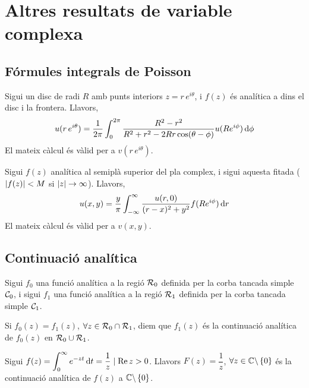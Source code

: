 \section{Altres resultats de variable complexa}
\subsection{Fórmules integrals de Poisson}
Sigui un disc de radi $R$ amb punts interiors $z=r\,e^{i\theta}$, i $f(z)$ és analítica a dins el disc i la frontera. Llavors,
\begin{align}
    u(r\,e^{i\theta}) = \frac{1}{2\pi} \int_{0}^{2\pi} \frac{R^{2} - r^{2}}{R^{2} + r^{2} - 2Rr \cos(\theta - \phi)} u(Re^{i\phi}) \mathop{}\!\mathrm{d} \phi
\end{align}
El mateix càlcul és vàlid per a $v(r\,e^{i\theta})$.

Sigui $f(z)$ analítica al semiplà superior del pla complex, i sigui aquesta fitada ( $\left| f(z) \right| < M$ si $\left| z \right| \to \infty$). Llavors,
\begin{align}
    u(x,y) = \frac{y}{\pi} \int_{-\infty}^{\infty} \frac{u(r,0)}{(r - x)^{2} + y^{2}} f(Re^{i\phi}) \mathop{}\!\mathrm{d} r
\end{align}
El mateix càlcul és vàlid per a $v(x,y)$.

\subsection{Continuació analítica}
\begin{defi}
    Sigui $f_{0}$ una funció analítica a la regió $\mathcal{R}_{0}$ definida per la corba tancada simple $\mathcal{C}_{0}$, i sigui $f_{1}$ una funció analítica a la regió $\mathcal{R}_{1}$ definida per la corba tancada simple $\mathcal{C}_{1}$.
    
    Si $f_{0}(z) = f_{1}(z)$, $\forall z \in \mathcal{R}_{0} \cap \mathcal{R}_{1}$, diem que $f_{1}(z)$ és la continuació analítica de $f_{0}(z)$ en $\mathcal{R}_{0} \cup \mathcal{R}_{1}$.
\end{defi}
\begin{example}
    Sigui $f(z) = \displaystyle \int_{0}^{\infty} e^{-zt} \mathop{}\!\mathrm{d} t = \frac{1}{z} \mid \operatorname{Re} z > 0$. Llavors $F(z) = \dfrac{1}{z}$, $\forall z \in \mathbb{C} \backslash \left\{ 0 \right\}$ és la continuació analítica de $f(z)$ a $\mathbb{C} \backslash \left\{ 0 \right\}$.
\end{example}

